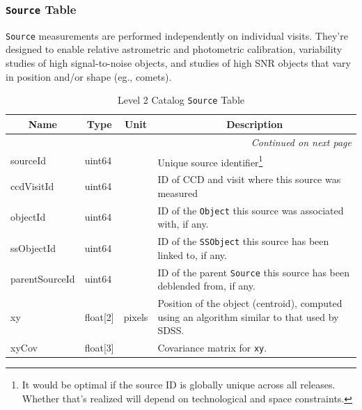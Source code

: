 \documentclass[12pt]{article}
\newcommand{\code}[1]{\texttt{#1}}
\newcommand{\Object}{\code{Object}\xspace}
\newcommand{\Source}{\code{Source}\xspace}
\newcommand{\SSObject}{\code{SSObject}\xspace}
\newcommand{\req}[1]{\marginpar{\tiny #1}}
\newcommand{\dmreq}[1]{\req{DMS-REQ-#1}}
\begin{document}
\subsubsection{\Source Table}
\label{sec:sourceTable}

\Source measurements are performed independently on individual visits. They're designed to enable relative astrometric and photometric calibration, variability studies of high signal-to-noise objects, and studies of high SNR objects that vary in position and/or shape (eg., comets).\dmreq{0267}

\begin{center}
\begin{longtable}{p{3cm}p{2cm}p{2cm}p{5cm}}
\caption[\Source Table]{Level 2 Catalog \Source Table
} \\

\hline \multicolumn{1}{c}{\bf Name} & \multicolumn{1}{c}{\bf Type} & \multicolumn{1}{c}{\bf Unit} & \multicolumn{1}{c}{\bf Description} \\ \hline
\endhead

\hline \multicolumn{4}{r}{{\em Continued on next page}} \\
\endfoot

\hline\hline
\endlastfoot

sourceId & uint64 & ~ & Unique source identifier\footnote{It would be optimal if the source ID is globally unique across all releases. Whether that's realized will depend on technological and space constraints.} \\

ccdVisitId & uint64 & ~ & ID of CCD and visit where this source was measured \\

objectId & uint64 & ~ & ID of the \Object this source was associated with, if any. \\

ssObjectId & uint64 & ~ & ID of the \SSObject this source has been linked to, if any. \\

parentSourceId & uint64 & ~ & ID of the parent \Source this source has been deblended from, if any. \\

xy & float[2] & pixels & Position of the object (centroid), computed using an algorithm similar to that used by SDSS.\\

xyCov & float[3] & ~ & Covariance matrix for {\tt xy}. \\


\end{longtable}
\end{center}
\end{document}
